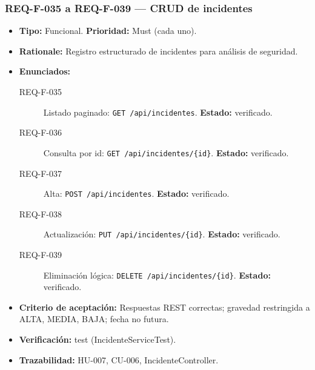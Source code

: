 \documentclass[12pt,a4paper]{article}
\begin{document}
\subsubsection{REQ-F-035 a REQ-F-039 --- CRUD de incidentes}
\begin{itemize}
  \item \textbf{Tipo:} Funcional. \textbf{Prioridad:} Must (cada uno).
  \item \textbf{Rationale:} Registro estructurado de incidentes para análisis de seguridad.
  \item \textbf{Enunciados:}
    \begin{description}
      \item[REQ-F-035] Listado paginado: \texttt{GET /api/incidentes}. \textbf{Estado:} verificado.
      \item[REQ-F-036] Consulta por id: \texttt{GET /api/incidentes/\{id\}}. \textbf{Estado:} verificado.
      \item[REQ-F-037] Alta: \texttt{POST /api/incidentes}. \textbf{Estado:} verificado.
      \item[REQ-F-038] Actualización: \texttt{PUT /api/incidentes/\{id\}}. \textbf{Estado:} verificado.
      \item[REQ-F-039] Eliminación lógica: \texttt{DELETE /api/incidentes/\{id\}}. \textbf{Estado:} verificado.
    \end{description}
  \item \textbf{Criterio de aceptación:} Respuestas REST correctas; gravedad restringida a ALTA, MEDIA, BAJA; fecha no futura.
  \item \textbf{Verificación:} test (IncidenteServiceTest).
  \item \textbf{Trazabilidad:} HU-007, CU-006, IncidenteController.
\end{itemize}

\end{document}
